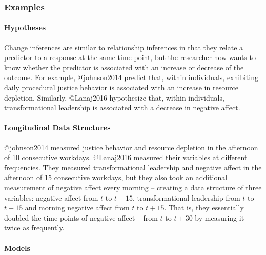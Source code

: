 \documentclass[]{article}
\let\oldparagraph\paragraph
\renewcommand{\paragraph}[1]{\oldparagraph{#1}\mbox{}}
\begin{document}
\hypertarget{examples-6}{%
\subsubsection{Examples}\label{examples-6}}

\hypertarget{hypotheses-6}{%
\paragraph{Hypotheses}\label{hypotheses-6}}

Change inferences are similar to relationship inferences in that they
relate a predictor to a response at the same time point, but the
researcher now wants to know whether the predictor is associated with an
increase or decrease of the outcome. For example, @johnson2014 predict
that, within individuals, exhibiting daily procedural justice behavior
is associated with an increase in resource depletion. Similarly,
@Lanaj2016 hypothesize that, within individuals, transformational
leadership is associated with a decrease in negative affect.

\hypertarget{longitudinal-data-structures-1}{%
\paragraph{Longitudinal Data
Structures}\label{longitudinal-data-structures-1}}

@johnson2014 measured justice behavior and resource depletion in the
afternoon of 10 consecutive workdays. @Lanaj2016 measured their
variables at different frequencies. They measured transformational
leadership and negative affect in the afternoon of 15 consecutive
workdays, but they also took an additional measurement of negative
affect every morning -- creating a data structure of three variables:
negative affect from \(t\) to \(t + 15\), transformational leadership
from \(t\) to \(t + 15\) and morning negative affect from \(t\) to
\(t + 15\). That is, they essentially doubled the time points of
negative affect -- from \(t\) to \(t + 30\) by measuring it twice as
frequently.

\hypertarget{models-6}{%
\paragraph{Models}\label{models-6}}
\end{document}
